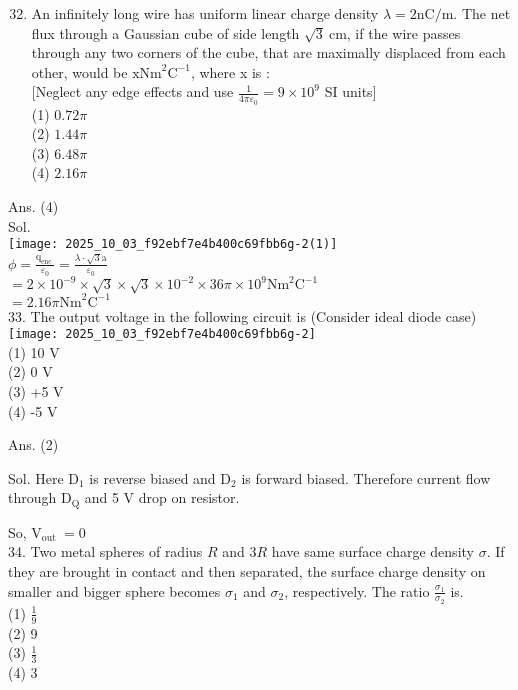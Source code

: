 \documentclass[10pt]{article}
\begin{document}
\begin{enumerate}
  \setcounter{enumi}{31}
  \item An infinitely long wire has uniform linear charge density \(\lambda=2 \mathrm{nC} / \mathrm{m}\). The net flux through a Gaussian cube of side length \(\sqrt{3} \mathrm{~cm}\), if the wire passes through any two corners of the cube, that are maximally displaced from each other, would be \(\mathrm{xNm}^{2} \mathrm{C}^{-1}\), where x is :\\[0pt]
[Neglect any edge effects and use \(\frac{1}{4 \pi \varepsilon_{0}}=9 \times 10^{9}\) SI units]\\
(1) \(0.72 \pi\)\\
(2) \(1.44 \pi\)\\
(3) \(6.48 \pi\)\\
(4) \(2.16 \pi\)
\end{enumerate}

Ans. (4)\\
Sol.\\
\texttt{[image: 2025\_10\_03\_f92ebf7e4b400c69fbb6g-2(1)]}\\
\(\phi=\frac{\mathrm{q}_{\text {enc }}}{\varepsilon_{0}}=\frac{\lambda \cdot \sqrt{3} \mathrm{a}}{\varepsilon_{0}}\)\\
\(=2 \times 10^{-9} \times \sqrt{3} \times \sqrt{3} \times 10^{-2} \times 36 \pi \times 10^{9} \mathrm{Nm}^{2} \mathrm{C}^{-1}\)\\
\(=2.16 \pi \mathrm{Nm}^{2} \mathrm{C}^{-1}\)\\
33. The output voltage in the following circuit is (Consider ideal diode case)\\
\texttt{[image: 2025\_10\_03\_f92ebf7e4b400c69fbb6g-2]}\\
(1) 10 V\\
(2) 0 V\\
(3) +5 V\\
(4) -5 V

Ans. (2)

Sol. Here \(\mathrm{D}_{1}\) is reverse biased and \(\mathrm{D}_{2}\) is forward biased. Therefore current flow through \(\mathrm{D}_{\mathrm{Q}}\) and 5 V drop on resistor.

So, \(\mathrm{V}_{\text {out }}=0\)\\
34. Two metal spheres of radius \(R\) and \(3 R\) have same surface charge density \(\sigma\). If they are brought in contact and then separated, the surface charge density on smaller and bigger sphere becomes \(\sigma_{1}\) and \(\sigma_{2}\), respectively. The ratio \(\frac{\sigma_{1}}{\sigma_{2}}\) is.\\
(1) \(\frac{1}{9}\)\\
(2) 9\\
(3) \(\frac{1}{3}\)\\
(4) 3
\end{document}
